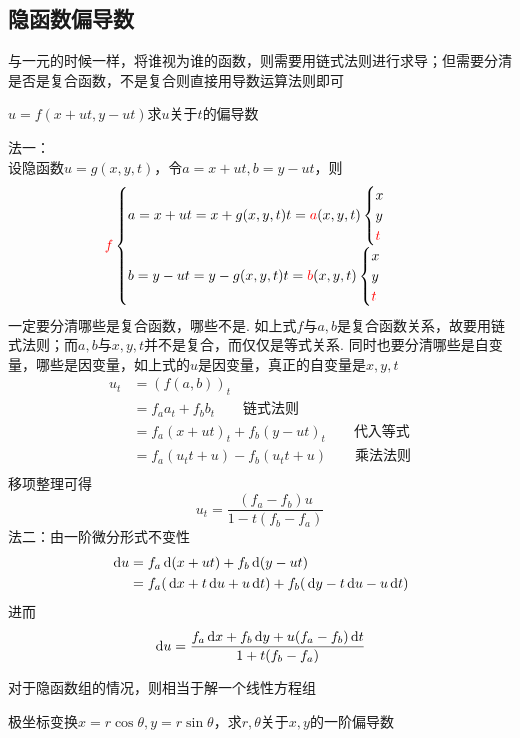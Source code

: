 \subsection{隐函数偏导数}
与一元的时候一样，将谁视为谁的函数，则需要用链式法则进行求导；但需要分清是否是复合函数，不是复合则直接用导数运算法则即可
\begin{example}
$u=f(x+ut,y-ut)$求$u$关于$t$的偏导数
\end{example}
\begin{analysis}
法一：\\
设隐函数$u=g(x,y,t)$，令$a=x+ut,b=y-ut$，则
\[\textcolor{red}{f}\begin{cases}a=x+ut=x+g(x,y,t)t=\textcolor{red}{a}(x,y,t)\begin{cases}x\\y\\\textcolor{red}{t}\end{cases}\\b=y-ut=y-g(x,y,t)t=\textcolor{red}{b}(x,y,t)\begin{cases}x\\y\\\textcolor{red}{t}\end{cases}\end{cases}\]
一定要分清哪些是复合函数，哪些不是. 如上式$f$与$a,b$是复合函数关系，故要用链式法则；而$a,b$与$x,y,t$并不是复合，而仅仅是等式关系.
同时也要分清哪些是自变量，哪些是因变量，如上式的$u$是因变量，真正的自变量是$x,y,t$
\[\begin{aligned}
u_t&=(f(a,b))_t\\
&=f_a a_t+f_b b_t\qquad\mbox{链式法则}\\
&=f_a (x+ut)_t + f_b (y-ut)_t\qquad\mbox{代入等式}\\
&=f_a (u_t t+u)- f_b (u_t t+u)\qquad\mbox{乘法法则}\\
\end{aligned}\]
移项整理可得
\[u_t=\dfrac{(f_a-f_b)u}{1-t(f_b-f_a)}\]
法二：由一阶微分形式不变性\\
\[\begin{aligned}
\,\mathrm{d} u&=f_a\,\mathrm{d}(x+ut)+f_b\,\mathrm{d}(y-ut)\\
&=f_a(\,\mathrm{d} x+t\,\mathrm{d} u+u\,\mathrm{d} t)+f_b(\,\mathrm{d} y-t\,\mathrm{d} u-u\,\mathrm{d} t)
\end{aligned}\]
进而
\[\,\mathrm{d} u=\frac{f_a\,\mathrm{d} x+f_b\,\mathrm{d} y+u(f_a-f_b)\,\mathrm{d} t}{1+t(f_b-f_a)}\]
\end{analysis}
对于隐函数组的情况，则相当于解一个线性方程组
\begin{example}
极坐标变换$x=r\cos\theta,y=r\sin\theta$，求$r,\theta$关于$x,y$的一阶偏导数
\end{example}
